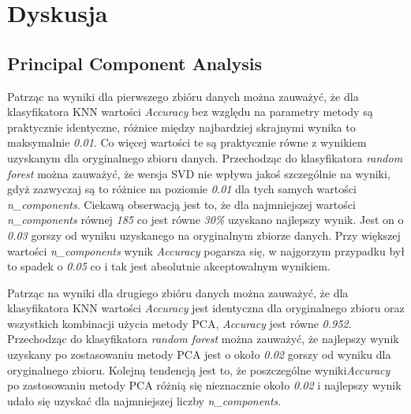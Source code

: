 \documentclass{classrep}
\begin{document}
    \section{Dyskusja}
    \label{summary} {

        \subsection{Principal Component Analysis} {
            Patrząc na wyniki dla pierwszego zbióru danych \cite{dataset_letters}
            można zauważyć, że dla klasyfikatora KNN wartości \textit{Accuracy} bez
            względu na parametry metody są praktycznie identyczne, różnice między
            najbardziej skrajnymi wynika to maksymalnie \textit{0.01}. Co więcej
            wartości te są praktycznie równe z wynikiem uzyskanym dla oryginalnego
            zbioru danych. Przechodząc do klasyfikatora \textit{random forest} można
            zauważyć, że wersja SVD nie wpływa jakoś szczególnie na wyniki, gdyż
            zazwyczaj są to różnice na poziomie \textit{0.01} dla tych samych wartości
            \textit{n\_components}. Ciekawą obserwacją jest to, że dla najmniejszej
            wartości \textit{n\_components} równej \textit{185} co jest równe
            \textit{30\%} uzyskano najlepszy wynik. Jest on o \textit{0.03} gorszy od
            wyniku uzyskanego na oryginalnym zbiorze danych. Przy większej wartości
            \textit{n\_components} wynik \textit{Accuracy} pogarsza się, w najgorzym
            przypadku był to spadek o \textit{0.05} co i tak jest absolutnie
            akceptowalnym wynikiem.

            Patrząc na wyniki dla drugiego zbióru danych \cite{dataset_numerals}
            można zauważyć, że dla klasyfikatora KNN wartości \textit{Accuracy}
            jest identyczna dla oryginalnego zbioru oraz wszystkich kombinacji użycia
            metody PCA, \textit{Accuracy} jest równe \textit{0.952}. Przechodząc do
            klasyfikatora \textit{random forest} można zauważyć, że najlepszy wynik
            uzyskany po zostasowaniu metody PCA jest o około \textit{0.02} gorszy od
            wyniku dla oryginalnego zbioru. Kolejną tendencją jest to, że poszczególne
            wyniki\textit{Accuracy} po zastosowaniu metody PCA różnią się nieznacznie
            około \textit{0.02} i najlepszy wynik udało się uzyskać dla najmniejszej
            liczby \textit{n\_components}.

}}
\end{document}
